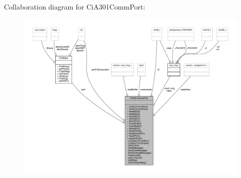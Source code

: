 Collaboration diagram for Ci\+A301\+Comm\+Port\+:\nopagebreak
\begin{figure}[H]
\begin{center}
\leavevmode
\includegraphics[width=350pt]{classCiA301CommPort__coll__graph}
\end{center}
\end{figure}

